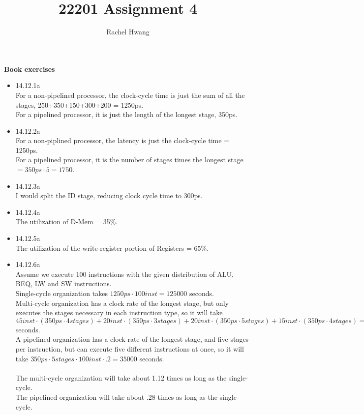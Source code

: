\documentclass[a4paper]{article}
\title{22201 Assignment 4}
\author{Rachel Hwang}
\begin{document}
\maketitle

\textbf{\large{Book exercises}}
\begin{itemize}
\item{14.12.1a} \\
For a non-pipelined processor, the clock-cycle time is just the sum of all the stages, 250+350+150+300+200 = 1250ps. \\
For a pipelined processor, it is just the length of the longest stage, 350ps.
\\


\item{14.12.2a} \\
For a non-piplined processor, the latency is just the clock-cycle time = 1250ps. \\
For a pipelined processor, it is the number of stages times the longest stage $= 350ps \cdot 5 = 1750$.
\\


\item{14.12.3a} \\
I would split the ID stage, reducing clock cycle time to 300ps.
\\


\item{14.12.4a} \\
The utilization of D-Mem = 35\%.
\\


\item{14.12.5a} \\
The utilization of the write-register portion of Registers = 65\%.
\\

\item{14.12.6a} \\
Assume we execute 100 instructions with the given distribution of ALU, BEQ, LW and SW instructions. \\
Single-cycle organization takes $1250ps \cdot 100inst = 125000$ seconds. \\
Multi-cycle organization has a clock rate of the longest stage, but only executes the stages necessary in each instruction type, so it will take $45inst \cdot(350ps \cdot 4stages) + 20inst \cdot(350ps \cdot 3 stages) + 20inst \cdot(350ps \cdot 5 stages) + 15inst \cdot(350ps \cdot 4 stages) = 140000$ seconds. \\
A pipelined organization has a clock rate of the longest stage, and five stages per instruction, but can execute five different instructions at once, so it will take  $350ps \cdot 5stages \cdot 100inst \cdot .2 = 35000$ seconds.\\
\\
The multi-cycle organization will take about 1.12 times as long as the single-cycle. \\
The pipelined organization will take about .28 times as long as the single-cycle.
\\


\end{itemize}
\end{document}
